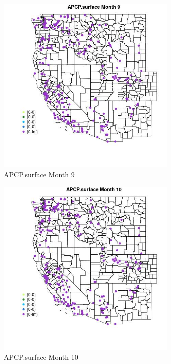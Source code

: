 \begin{figure} 
\centering  
\includegraphics[width=0.77\textwidth]{Code_Outputs/Report_ML_input_PM25_Step4_part_e_de_duplicated_aveswNAs_MapObsMo9APCPsurface.jpg} 
\caption{\label{fig:Report_ML_input_PM25_Step4_part_e_de_duplicated_aveswNAsMapObsMo9APCPsurface}APCP.surface Month 9} 
\end{figure} 
 

\begin{figure} 
\centering  
\includegraphics[width=0.77\textwidth]{Code_Outputs/Report_ML_input_PM25_Step4_part_e_de_duplicated_aveswNAs_MapObsMo10APCPsurface.jpg} 
\caption{\label{fig:Report_ML_input_PM25_Step4_part_e_de_duplicated_aveswNAsMapObsMo10APCPsurface}APCP.surface Month 10} 
\end{figure} 
 

